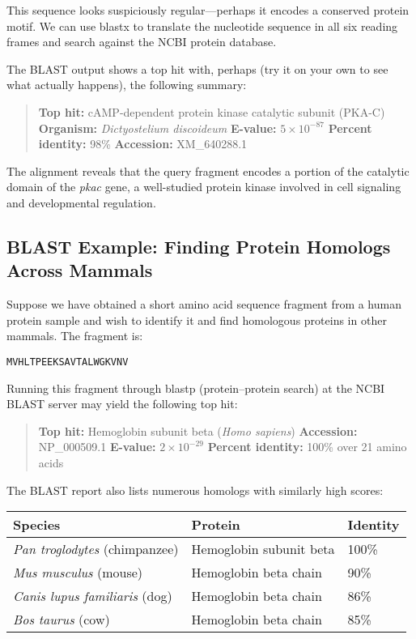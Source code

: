This sequence looks suspiciously regular—perhaps it encodes a conserved protein motif. We can use blastx to translate the nucleotide sequence in all six reading frames and search against the NCBI protein database.

The BLAST output shows a top hit with, perhaps (try it on your own to see what actually happens), the following summary:

\begin{quote}
\textbf{Top hit:} cAMP-dependent protein kinase catalytic subunit (PKA-C)  
\textbf{Organism:} \textit{Dictyostelium discoideum}  
\textbf{E-value:} \(5 \times 10^{-87}\)  
\textbf{Percent identity:} 98\%
\textbf{Accession:} XM\_640288.1
\end{quote}

The alignment reveals that the query fragment encodes a portion of the catalytic domain of the \textit{pkac} gene, a well-studied protein kinase involved in cell signaling and developmental regulation.

\subsection*{BLAST Example: Finding Protein Homologs Across Mammals}

Suppose we have obtained a short amino acid sequence fragment from a human protein sample and wish to identify it and find homologous proteins in other mammals. The fragment is:

\begin{verbatim}
MVHLTPEEKSAVTALWGKVNV
\end{verbatim}

Running this fragment through blastp (protein–protein search) at the NCBI BLAST server may yield the following top hit:

\begin{quote}
\textbf{Top hit:} Hemoglobin subunit beta (\textit{Homo sapiens})  
\textbf{Accession:} NP\_000509.1  
\textbf{E-value:} \(2 \times 10^{-29}\)  
\textbf{Percent identity:} 100\% over 21 amino acids
\end{quote}

The BLAST report also lists numerous homologs with similarly high scores:

\begin{center}
\begin{tabular}{lll}
\toprule
Species & Protein & Identity \\
\midrule
\textit{Pan troglodytes} (chimpanzee) & Hemoglobin subunit beta & 100\% \\
\textit{Mus musculus} (mouse) & Hemoglobin beta chain & 90\% \\
\textit{Canis lupus familiaris} (dog) & Hemoglobin beta chain & 86\% \\
\textit{Bos taurus} (cow) & Hemoglobin beta chain & 85\% \\
\bottomrule
\end{tabular}
\end{center}

